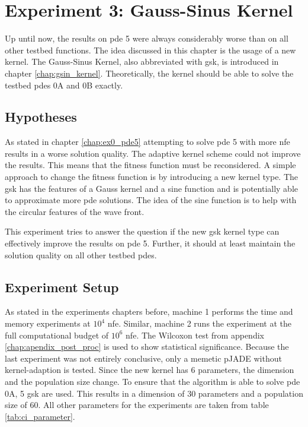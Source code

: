 \documentclass[./\jobname.tex]{subfiles}
\begin{document}
\chapter {Experiment 3: Gauss-Sinus Kernel}
\label{chap:experimet_3}

Up until now, the results on \gls{pde} 5 were always considerably worse than on all other testbed functions. The idea discussed in this chapter is the usage of a new kernel. The Gauss-Sinus Kernel, also abbreviated with \gls{gsk}, is introduced in chapter \ref{chap:gsin_kernel}. Theoretically, the kernel should be able to solve the testbed \gls{pde}s 0A and 0B exactly.  

\section{Hypotheses}
As stated in chapter \ref{chap:ex0_pde5} attempting to solve \gls{pde} 5 with more \gls{nfe} results in a worse solution quality. The adaptive kernel scheme could not improve the results. This means that the fitness function must be reconsidered. A simple approach to change the fitness function is by introducing a new kernel type. The \gls{gsk} has the features of a Gauss kernel and a sine function and is potentially able to approximate more \gls{pde} solutions. The idea of the sine function is to help with the circular features of the wave front. 

This experiment tries to answer the question if the new \gls{gsk} kernel type can effectively improve the results on \gls{pde} 5. Further, it should at least maintain the solution quality on all other testbed \gls{pde}s. 

\section{Experiment Setup}

As stated in the experiments chapters before, machine 1 performs the time and memory experiments at $10^4$ \gls{nfe}. Similar, machine 2 runs the experiment at the full computational budget of $10^6$ \gls{nfe}. The Wilcoxon test from appendix \ref{chap:apendix_post_proc} is used to show statistical significance. Because the last experiment was not entirely conclusive, only a memetic pJADE without kernel-adaption is tested. Since the new kernel has 6 parameters, the dimension and the population size change. To ensure that the algorithm is able to solve \gls{pde} 0A, 5 \gls{gsk} are used. This results in a dimension of 30 parameters and a population size of 60. All other parameters for the experiments are taken from table \ref{tab:ci_parameter}. 
\end{document}
